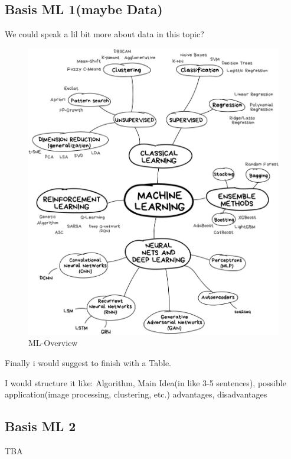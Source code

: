 
\subsection{Basis ML 1(maybe Data)}
We could speak a lil bit more about data in this topic?

\begin{figure}[hbtp]
	\centering
	\includegraphics[width=1\textwidth]{ML}
	\caption{ML-Overview}
	\label{fig:Datensatz - unbearbeitet}
\end{figure}

Finally i would suggest to finish with a Table.

I would structure it like:
Algorithm, Main Idea(in like 3-5 sentences), possible application(image processing, clustering, etc.) advantages, disadvantages




\subsection{Basis ML 2}
TBA





\newpage